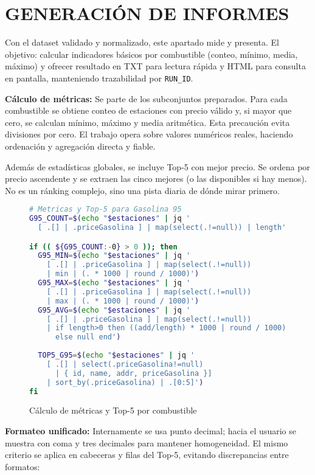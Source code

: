 \chapter{GENERACIÓN DE INFORMES}

Con el dataset validado y normalizado, este apartado mide y presenta. El objetivo: calcular indicadores básicos por combustible (conteo, mínimo, media, máximo) y ofrecer resultado en TXT para lectura rápida y HTML para consulta en pantalla, manteniendo trazabilidad por \texttt{RUN\_ID}.

\textbf{Cálculo de métricas:} Se parte de los subconjuntos preparados. Para cada combustible se obtiene conteo de estaciones con precio válido y, si mayor que cero, se calculan mínimo, máximo y media aritmética. Esta precaución evita divisiones por cero. El trabajo opera sobre valores numéricos reales, haciendo ordenación y agregación directa y fiable.

Además de estadísticas globales, se incluye Top-5 con mejor precio. Se ordena por precio ascendente y se extraen las cinco mejores (o las disponibles si hay menos). No es un ránking complejo, sino una pista diaria de dónde mirar primero.

\begin{figure}[H]
  \footnotesize
  \begin{lstlisting}[language=bash]
# Metricas y Top-5 para Gasolina 95
G95_COUNT=$(echo "$estaciones" | jq '
  [ .[] | .priceGasolina ] | map(select(.!=null)) | length')

if (( ${G95_COUNT:-0} > 0 )); then
  G95_MIN=$(echo "$estaciones" | jq '
    [ .[] | .priceGasolina ] | map(select(.!=null)) 
    | min | (. * 1000 | round / 1000)')
  G95_MAX=$(echo "$estaciones" | jq '
    [ .[] | .priceGasolina ] | map(select(.!=null)) 
    | max | (. * 1000 | round / 1000)')
  G95_AVG=$(echo "$estaciones" | jq '
    [ .[] | .priceGasolina ] | map(select(.!=null)) 
    | if length>0 then ((add/length) * 1000 | round / 1000) 
      else null end')
  
  TOP5_G95=$(echo "$estaciones" | jq '
    [ .[] | select(.priceGasolina!=null)
      | { id, name, addr, priceGasolina }]
    | sort_by(.priceGasolina) | .[0:5]')
fi
\end{lstlisting}
  \caption{Cálculo de métricas y Top-5 por combustible}
\end{figure}

\textbf{Formateo unificado:} Internamente se usa punto decimal; hacia el usuario se muestra con coma y tres decimales para mantener homogeneidad. El mismo criterio se aplica en cabeceras y filas del Top-5, evitando discrepancias entre formatos:

